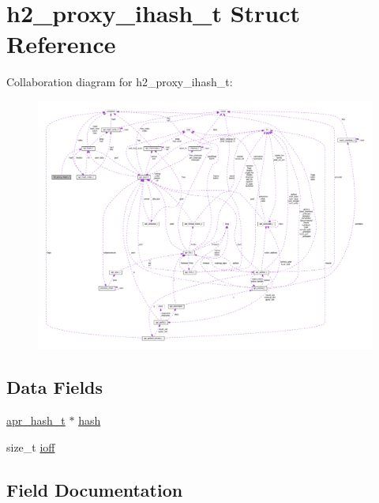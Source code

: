 \hypertarget{structh2__proxy__ihash__t}{}\section{h2\+\_\+proxy\+\_\+ihash\+\_\+t Struct Reference}
\label{structh2__proxy__ihash__t}


Collaboration diagram for h2\+\_\+proxy\+\_\+ihash\+\_\+t\+:
\nopagebreak
\begin{figure}[H]
\begin{center}
\leavevmode
\includegraphics[width=350pt]{structh2__proxy__ihash__t__coll__graph}
\end{center}
\end{figure}
\subsection*{Data Fields}
\begin{DoxyCompactItemize}
\item 
\hyperlink{structapr__hash__t}{apr\+\_\+hash\+\_\+t} $\ast$ \hyperlink{structh2__proxy__ihash__t_a571cfbedb6d68c96706cb214dac890d8}{hash}
\item 
size\+\_\+t \hyperlink{structh2__proxy__ihash__t_ad9d19db6645a3ae8280a09c68ae26ce2}{ioff}
\end{DoxyCompactItemize}


\subsection{Field Documentation}
